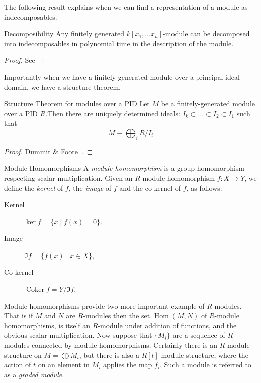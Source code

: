 The following result explains when we can find a representation of a module as indecomposables.
\begin{theorem}{Decomposibility}
Any finitely generated $k[x_1, \ldots x_n]$-module can be decomposed into indecomposables in polynomial time in the description of the module. 
\end{theorem}
\begin{proof}
See~\cite{caikm-ptafm-1997}
\end{proof}
Importantly when we have a finitely generated module over a principal ideal domain, we have a structure theorem. 
\begin{theorem}{Structure Theorem for modules over a PID}
Let $M$ be a finitely-generated module over a PID $R$.Then there are uniquely determined ideals:
$I_k \subset \ldots \subset I_2  \subset I_1$ 
such that
\[ M \equiv \bigoplus_i R/I_i \]
\end{theorem}
\begin{proof}
Dummit \& Foote~\cite{dummitnfoote}.
\end{proof}
\begin{definition}{Module Homomorphisms}
A \emph{module homomorphism} is a group homomorphism respecting scalar multiplication. Given an $R$-module homomorphism $f: X \rightarrow Y $, we define the \emph{kernel} of $f$, the \emph{image} of $f$ and the co-kernel of $f$, as follows: 
\begin{description}
\item[Kernel] $\ker{f} = \{ x \mid f(x) = 0 \}$. 
\item[Image] $\Im{f} = \{ f(x) \mid x \in X\}$, 
\item[Co-kernel] $\operatorname{Coker}{f} = Y/\Im{f}$.
\end{description}
\end{definition}

Module homomorphisms provide two more important example of $R$-modules. That is if $M$ and $N$ are $R$-modules then the set $\operatorname{Hom}(M,N)$ of $R$-module homomorphisms, is itself an $R$-module under addition of functions, and the obvious scalar multiplication. Now suppose that $\{M_i\}$ are a sequence of $R$-modules connected by module homomorphisms. Certainly there is an $R$-module structure on $M = \bigoplus M_i$, but there is also a $R[t]$-module structure, where the action of $t$ on an element in $M_i$ applies the map $f_i$. Such a module is referred to as a \emph{graded module}.

